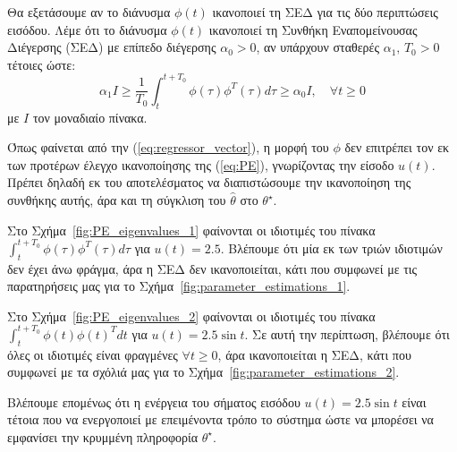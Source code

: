 \documentclass[a4paper,12pt]{article}
\begin{document}
Θα εξετάσουμε αν το διάνυσμα $\phi(t)$ ικανοποιεί τη ΣΕΔ για τις δύο περιπτώσεις εισόδου. Λέμε ότι το διάνυσμα 
$\phi(t)$ ικανοποιεί τη Συνθήκη Εναπομείνουσας Διέγερσης (ΣΕΔ) με επίπεδο διέγερσης $\alpha_0 > 0$, αν
υπάρχουν σταθερές $\alpha_1, \, T_0 > 0$ τέτοιες ώστε:
\begin{equation}
    \alpha_1 I \ge \frac{1}{T_0} \int_{t}^{t+T_0} \phi(\tau) \phi^T(\tau) d\tau \ge \alpha_0 I, 
    \quad \forall t \ge 0
    \label{eq:PE}
\end{equation}
με $I$ τον μοναδιαίο πίνακα.

Όπως φαίνεται από την (\ref{eq:regressor_vector}), η μορφή του $\phi$ δεν επιτρέπει τον εκ των προτέρων
έλεγχο ικανοποίησης της (\ref{eq:PE}), γνωρίζοντας την είσοδο $u(t)$. Πρέπει δηλαδή εκ του αποτελέσματος να 
διαπιστώσουμε την ικανοποίηση της συνθήκης αυτής, άρα και τη σύγκλιση του $\hat{\theta}$ στο $\theta^{\star}$.

Στο Σχήμα~\ref{fig:PE_eigenvalues_1} φαίνονται οι ιδιοτιμές του πίνακα 
$\int_{t}^{t+T_0} \phi(\tau) \phi^T(\tau) d\tau$ για $u(t) = 2.5$. Βλέπουμε ότι μία εκ των τριών ιδιοτιμών δεν
έχει άνω φράγμα, άρα η ΣΕΔ δεν ικανοποιείται, κάτι που συμφωνεί με τις παρατηρήσεις μας για το 
Σχήμα~\ref{fig:parameter_estimations_1}.

Στο Σχήμα~\ref{fig:PE_eigenvalues_2} φαίνονται οι ιδιοτιμές του πίνακα 
$\int_{t}^{t+T_0} \phi(t) \phi(t)^T dt$ για $u(t) = 2.5 \sin t$. Σε αυτή την περίπτωση, βλέπουμε ότι όλες οι 
ιδιοτιμές είναι φραγμένες $\forall t \ge 0$, άρα ικανοποιείται η ΣΕΔ, κάτι που συμφωνεί με τα σχόλιά μας 
για το Σχήμα~\ref{fig:parameter_estimations_2}. 

Βλέπουμε επομένως ότι η ενέργεια του σήματος εισόδου $u(t) = 2.5 \sin t$ είναι τέτοια που να ενεργοποιεί με 
επειμένοντα τρόπο το σύστημα ώστε να μπορέσει να εμφανίσει την κρυμμένη πληροφορία $\theta^{\star}$.
\end{document}

